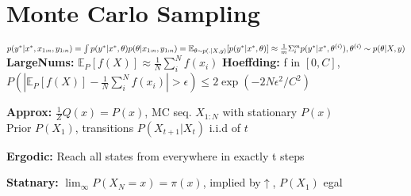 \begin{comment}
	\pagebreak
\end{comment}

\section{Monte Carlo Sampling}
$p(y^* | x^*, x_{1:n}, y_{1:n}) = \int p(y^* | x^*, \theta) p(\theta | x_{1:n}, y_{1:n}) = \\
\mathbb{E}_{\theta \sim p(.|X,y)}[p(y^*|x^*,\theta)]
\approx \frac{1}{m}\Sigma^m_i p(y^*|x^*,\theta^{(i)}), \theta^{(i)} \sim p(\theta|X,y)$\\
\textbf{LargeNums:} $\mathbb{E}_P[f(X)] \approx \frac{1}{N}\sum_i^N f(x_i)$ \textbf{Hoeffding:} f in $[0, C]$, 
$P(|\mathbb{E}_P[f(X)] - \frac{1}{N}\sum_i^N f(x_i)| > \epsilon) \leq 2 \exp(-2N\epsilon^2 / C^2)$\\
\begin{comment}
	\textbf{Intuition:} Based on the law of large numbers, we can derive the required number of samples N to be in a certain probability bound.\\
\end{comment}

\textbf{Approx:} $\frac{1}{Z}Q(x) = P(x)$, MC seq. $X_{1:N}$ with stationary $P(x)$\\
Prior $P(X_1)$, transitions $P(X_{t+1}|X_t)$ i.i.d of $t$ \\
\begin{comment}
	The Markov chain is a sequence of Random Variables, mostly the random variables are states in $\{1,..,M\}$.\\
	The MC is stationary if the transition probabilities are independent of t, e.g. they don't change if t changes.\\
\end{comment}

\textbf{Ergodic:} Reach all states from everywhere in exactly t steps\\
\begin{comment}
	\textbf{Note:} It must be exactly t steps to reach every state from everywhere. 
	\textbf{Example:} MC (1)-(2), whereas the state (2) can be reached from (1) after t=uneven steps, whereas it can be reached from (2) only after t=even steps.\\
\end{comment}

\textbf{Statnary:} $\lim_{\infty} P(X_N = x) = \pi(x)$, implied by$\uparrow$, $P(X_1)$ egal\\


